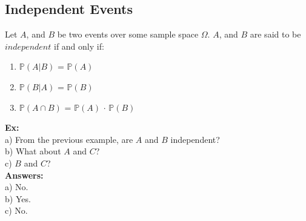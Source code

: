 \documentclass{article}
\newcommand{\bbP}{\mathbb{P}}
\newcommand{\Om}{\Omega}
\begin{document}
\subsection{Independent Events}
Let $A$, and $B$ be two events over some sample space $\Om$. $A$, and $B$ are said to be $independent$ if and only if:
\begin{enumerate}
	\item $\bbP(A|B)$ = $\bbP(A)$
	\item $\bbP(B|A)$ = $\bbP(B)$
	\item $\bbP(A \cap B)$ = $\bbP(A)$ $\cdot$ $\bbP(B)$
\end{enumerate}
\textbf{Ex: }\\ 
a) From the previous example, are $A$ and $B$ independent? \\
b) What about $A$ and $C$?\\
c) $B$ and $C$?\\
\textbf{Answers:}\\
a) No.\\
b) Yes.\\
c) No.\\
\end{document}
